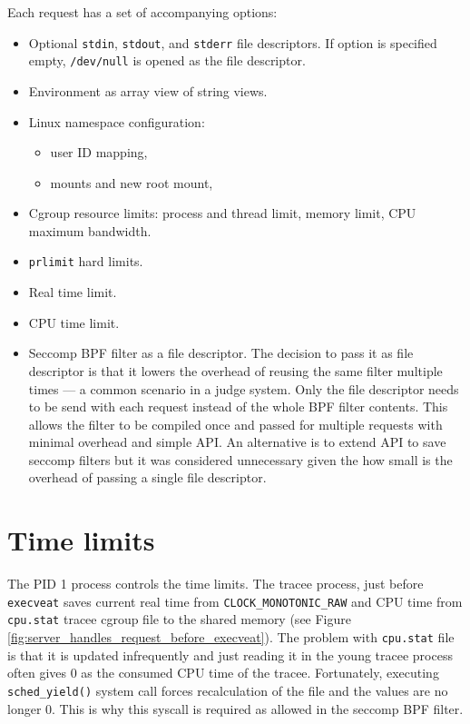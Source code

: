 \documentclass[en]{pracamgr}
\begin{document}
Each request has a set of accompanying options:
\begin{itemize}
    \item Optional \texttt{stdin}, \texttt{stdout}, and \texttt{stderr} file descriptors. If option is specified empty, \texttt{/dev/null} is opened as the file descriptor.
    \item Environment as array view of string views.
    \item Linux namespace configuration:
        \begin{itemize}
            \item user ID mapping,
            \item mounts and new root mount,
        \end{itemize}
    \item Cgroup resource limits: process and thread limit, memory limit, CPU maximum bandwidth.
    \item \texttt{prlimit} hard limits.
    \item Real time limit.
    \item CPU time limit.
    \item Seccomp BPF filter as a file descriptor. The decision to pass it as file descriptor is that it lowers the overhead of reusing the same filter multiple times --- a common scenario in a judge system. Only the file descriptor needs to be send with each request instead of the whole BPF filter contents. This allows the filter to be compiled once and passed for multiple requests with minimal overhead and simple API. An alternative is to extend API to save seccomp filters but it was considered unnecessary given the how small is the overhead of passing a single file descriptor.
\end{itemize}

\section{Time limits}

The PID 1 process controls the time limits. The tracee process, just before \texttt{execveat} saves current real time from \texttt{CLOCK\_MONOTONIC\_RAW} and CPU time from \texttt{cpu.stat} tracee cgroup file to the shared memory (see Figure \ref{fig:server_handles_request_before_execveat}). The problem with \texttt{cpu.stat} file is that it is updated infrequently and just reading it in the young tracee process often gives 0 as the consumed CPU time of the tracee. Fortunately, executing \texttt{sched\_yield()} system call forces recalculation of the file and the values are no longer 0. This is why this syscall is required as allowed in the seccomp BPF filter.
\end{document}

